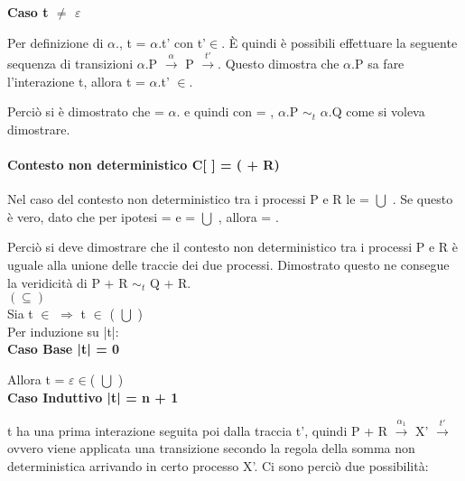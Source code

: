 \textbf{Caso t $\not=$ $\varepsilon$}

Per definizione di $\alpha$., t = $\alpha$.t' con t'$\in$. È quindi è possibili effettuare la seguente sequenza di transizioni $\alpha$.P $ \overset{\alpha}\rightarrow$ P $\overset{t'}\rightarrow $. Questo dimostra che $\alpha$.P sa fare l'interazione t, allora t = $\alpha$.t' $\in$.

Perciò si è dimostrato che  = $\alpha$. e quindi con  = , $\alpha$.P $\sim_{t}$ $\alpha$.Q come si voleva dimostrare.
\\

\paragraph{Contesto non deterministico  C[ ] = (\hspace{0.3cm} + R)} \mbox{}

Nel caso del contesto non deterministico tra i processi P e R le  =  $\bigcup$ . Se questo è vero, dato che per ipotesi  =  e  =  $\bigcup$ , allora  =  .

Perciò si deve dimostrare che il contesto non deterministico tra i processi P e R è uguale alla unione delle traccie dei due processi. Dimostrato questo ne consegue la veridicità di P + R $\sim_{t}$ Q + R.\\

$(\subseteq)$ \\

Sia t $\in$   $\Rightarrow$  t $\in$ ( $\bigcup$ )\\
Per induzione su |t|:
\\

\textbf{Caso Base |t| = 0}

Allora t = $\varepsilon \in$( $\bigcup$ )
\\

\textbf{Caso Induttivo |t| = n + 1}

t ha una prima interazione seguita poi dalla traccia t', quindi P + R $ \overset{\alpha_{1}}\rightarrow $ X' $\overset{t'}\rightarrow$ ovvero viene applicata una transizione secondo la regola della somma non deterministica arrivando in certo processo X'. Ci sono perciò due possibilità:

